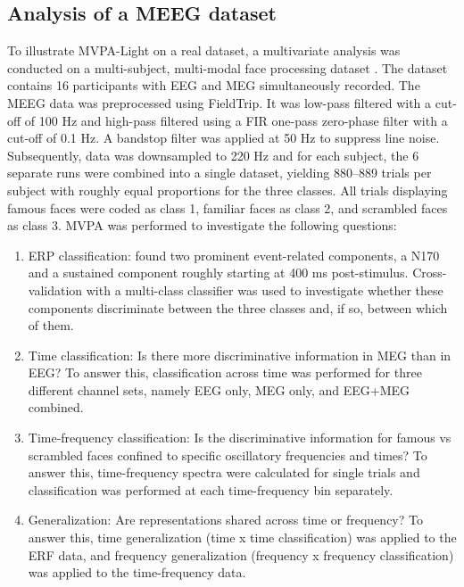\documentclass[utf8]{frontiersSCNS} %
\begin{document}
\subsection{Analysis of a MEEG dataset}

To illustrate MVPA-Light on a real dataset, a multivariate analysis was conducted on a multi-subject, multi-modal face processing dataset \citep{Wakeman2015ADataset,Wakeman2014OpenfMRI}. The dataset contains 16 participants with EEG and MEG simultaneously recorded. The MEEG data was preprocessed using FieldTrip. It was low-pass filtered with a cut-off of 100 Hz and high-pass filtered using a FIR one-pass zero-phase filter with a cut-off of 0.1 Hz. A bandstop filter was applied at 50 Hz to suppress line noise. Subsequently, data was downsampled to 220 Hz and for each subject, the 6 separate runs were combined into a single dataset, yielding 880--889 trials per subject with roughly equal proportions for the three classes. All trials displaying famous faces were coded as class 1, familiar faces as class 2, and scrambled faces as class 3. MVPA was performed to investigate the following questions:

\begin{enumerate}
    \item ERP classification: \cite{Wakeman2015ADataset} found two prominent event-related components, a N170 and a sustained component roughly starting at 400 ms post-stimulus. Cross-validation with a multi-class classifier was used to investigate whether these components discriminate between the three classes and, if so, between which of them.
    \item Time classification: Is there more discriminative information in MEG than in EEG? To answer this, classification across time was performed for three different channel sets, namely EEG only, MEG only, and EEG+MEG combined. 
    \item Time-frequency classification: Is the discriminative information for famous vs scrambled faces confined to specific oscillatory frequencies and times? To answer this, time-frequency spectra were calculated for single trials and classification was performed at each time-frequency bin separately. 
    \item Generalization: Are representations shared across time \citep{King2014} or frequency? To answer this, time generalization (time x time classification) was applied to the ERF data, and frequency generalization (frequency x frequency classification) was applied to the time-frequency data.
\end{enumerate}
\end{document}
